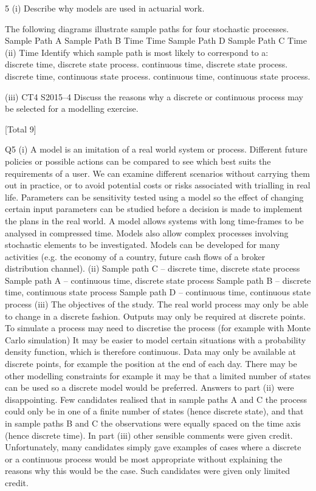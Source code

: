 \documentclass[a4paper,12pt]{article}
\begin{document}
5
(i)
Describe why models are used in actuarial work.

The following diagrams illustrate sample paths for four stochastic processes.
Sample Path A
Sample Path B
Time
Time
Sample Path D
Sample Path C
Time
(ii)
Time
Identify which sample path is most likely to correspond to a:




discrete time, discrete state process.
continuous time, discrete state process.
discrete time, continuous state process.
continuous time, continuous state process.

(iii)
CT4 S2015–4
Discuss the reasons why a discrete or continuous process may be selected for a
modelling exercise.

[Total 9]

Q5
(i)
A model is an imitation of a real world system or process.
Different future policies or possible actions can be compared to see which best
suits the requirements of a user.
We can examine different scenarios without carrying them out in practice, or
to avoid potential costs or risks associated with trialling in real life.
Parameters can be sensitivity tested using a model so the effect of changing
certain input parameters can be studied before a decision is made to implement
the plans in the real world.
A model allows systems with long time-frames to be analysed in compressed
time.
Models also allow complex processes involving stochastic elements to be
investigated.
Models can be developed for many activities (e.g. the economy of a country,
future cash flows of a broker distribution channel).
(ii) Sample path C – discrete time, discrete state process
Sample path A – continuous time, discrete state process
Sample path B – discrete time, continuous state process
Sample path D – continuous time, continuous state process
(iii) The objectives of the study.
The real world process may only be able to change in a discrete fashion.
Outputs may only be required at discrete points.
To simulate a process may need to discretise the process (for example with
Monte Carlo simulation)
It may be easier to model certain situations with a probability density function,
which is therefore continuous.
Data may only be available at discrete points, for example the position at the
end of each day.
There may be other modelling constraints for example it may be that a limited number of states can be used so a discrete model would be preferred.
Answers to part (ii) were disappointing. Few candidates realised that in sample paths A and C the process could only be in one of a finite number of
states (hence discrete state), and that in sample paths B and C the observations were equally spaced on the time axis (hence discrete time). In
part (iii) other sensible comments were given credit. Unfortunately, many candidates simply gave examples of cases where a discrete or a continuous
process would be most appropriate without explaining the reasons why this would be the case. Such candidates were given only limited credit.
\end{document}
